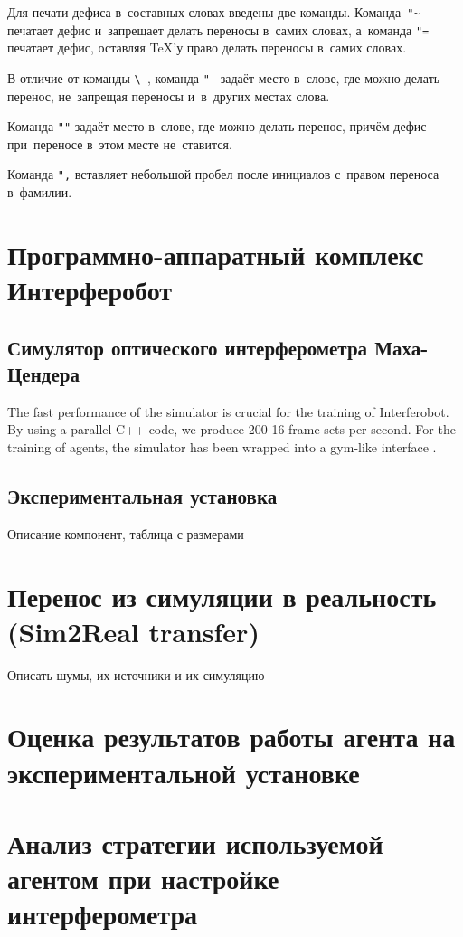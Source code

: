 Для печати дефиса в~составных словах введены две команды. Команда~\verb|"~|
печатает дефис и~запрещает делать переносы в~самих словах, а~команда \verb|"=|
печатает дефис, оставляя \TeX ’у право делать переносы в~самих словах.

В отличие от команды \verb|\-|, команда \verb|"-| задаёт место в~слове, где
можно делать перенос, не~запрещая переносы и~в~других местах слова.

Команда \verb|""| задаёт место в~слове, где можно делать перенос, причём дефис
при~переносе в~этом месте не~ставится.

Команда \verb|",| вставляет небольшой пробел после инициалов с~правом переноса
в~фамилии.

\section{Программно-аппаратный комплекс Интерферобот}

\subsection{Симулятор оптического интерферометра Маха-Цендера}
The fast performance of the simulator is crucial for the training of Interferobot. By using a parallel C++ code, we produce 200 16-frame sets per second. For the training of agents, the simulator has been wrapped into a gym-like interface \cite{brockman2016openai}. 

\subsection{Экспериментальная установка}

Описание компонент, таблица с размерами

\section{Перенос из симуляции в реальность (Sim2Real transfer)}

Описать шумы, их источники и их симуляцию


\section{Оценка результатов работы агента на экспериментальной установке}

\section{Анализ стратегии используемой агентом при настройке интерферометра}

